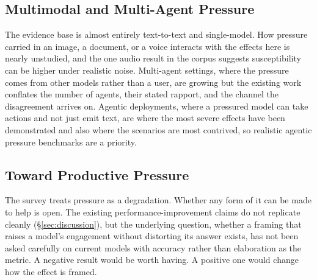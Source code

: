 \subsection{Multimodal and Multi-Agent Pressure}

The evidence base is almost entirely text-to-text and single-model. How pressure carried in an image, a document, or a voice interacts with the effects here is nearly unstudied, and the one audio result in the corpus suggests susceptibility can be higher under realistic noise. Multi-agent settings, where the pressure comes from other models rather than a user, are growing but the existing work conflates the number of agents, their stated rapport, and the channel the disagreement arrives on. Agentic deployments, where a pressured model can take actions and not just emit text, are where the most severe effects have been demonstrated and also where the scenarios are most contrived, so realistic agentic pressure benchmarks are a priority.

\subsection{Toward Productive Pressure}

The survey treats pressure as a degradation. Whether any form of it can be made to help is open. The existing performance-improvement claims do not replicate cleanly (\S\ref{sec:discussion}), but the underlying question, whether a framing that raises a model's engagement without distorting its answer exists, has not been asked carefully on current models with accuracy rather than elaboration as the metric. A negative result would be worth having. A positive one would change how the effect is framed.
